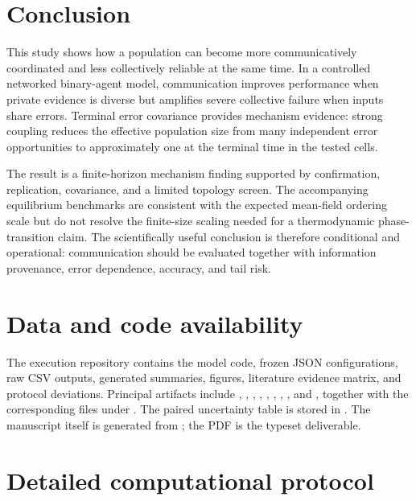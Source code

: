 \documentclass[11pt,a4paper]{article}
\begin{document}
\section{Conclusion}

This study shows how a population can become more communicatively coordinated and less collectively reliable at the same time. In a controlled networked binary-agent model, communication improves performance when private evidence is diverse but amplifies severe collective failure when inputs share errors. Terminal error covariance provides mechanism evidence: strong coupling reduces the effective population size from many independent error opportunities to approximately one at the terminal time in the tested cells.

The result is a finite-horizon mechanism finding supported by confirmation, replication, covariance, and a limited topology screen. The accompanying equilibrium benchmarks are consistent with the expected mean-field ordering scale but do not resolve the finite-size scaling needed for a thermodynamic phase-transition claim. The scientifically useful conclusion is therefore conditional and operational: communication should be evaluated together with information provenance, error dependence, accuracy, and tail risk.

\section{Data and code availability}

The execution repository contains the model code, frozen JSON configurations, raw CSV outputs, generated summaries, figures, literature evidence matrix, and protocol deviations. Principal artifacts include , , , , , , , , and , together with the corresponding files under . The paired uncertainty table is stored in . The manuscript itself is generated from ; the PDF is the typeset deliverable.

\appendix

\section{Detailed computational protocol}
\end{document}
